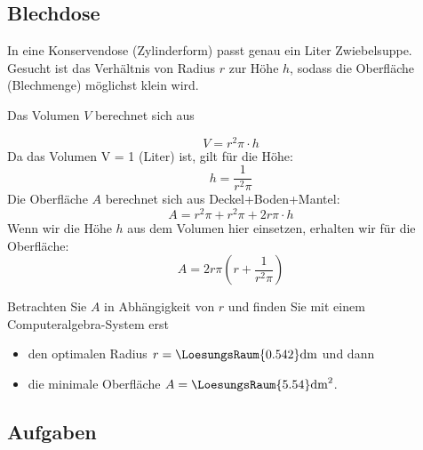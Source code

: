 
\newpage

\subsection{Blechdose}
In eine Konservendose (Zylinderform) passt genau ein Liter Zwiebelsuppe. Gesucht ist das Verhältnis von Radius $r$ zur Höhe $h$, sodass die Oberfläche (Blechmenge) möglichst klein wird.

Das Volumen $V$ berechnet sich aus

$$V = r^2\pi\cdot{}h$$
Da das Volumen V = 1 (Liter) ist, gilt für die Höhe:
$$h = \frac{1}{r^2\pi}$$
Die Oberfläche $A$ berechnet sich aus Deckel+Boden+Mantel:
$$A=r^2\pi + r^2\pi + 2r\pi\cdot{}h$$
Wenn wir die Höhe $h$ aus dem Volumen hier einsetzen, erhalten wir für die Oberfläche:
$$A=2r\pi\left(r+\frac{1}{r^2\pi}\right)$$

Betrachten Sie $A$ in Abhängigkeit von $r$ und finden Sie mit einem
Computeralgebra-System erst
\begin{itemize}
\item
  den optimalen Radius $r=\LoesungsRaum{0.542}\textrm{dm}$ und dann
\item
  die minimale Oberfläche $A= \LoesungsRaum{5.54}\textrm{dm}^2$.
\end{itemize}

\subsection*{Aufgaben}

